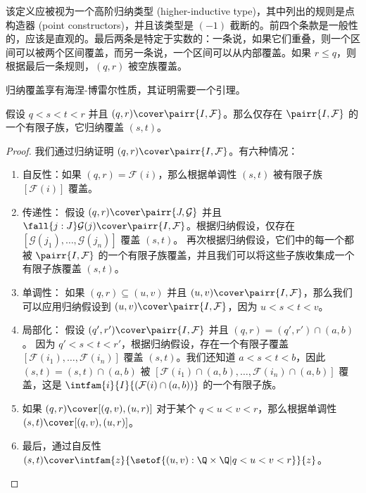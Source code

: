 该定义应被视为一个高阶归纳类型 (higher-inductive type)，其中列出的规则是点构造器 (point constructors)，并且该类型是 $(-1)$ 截断的。前四个条款是一般性的，应该是直观的。最后两条是特定于实数的：一条说，如果它们重叠，则一个区间可以被两个区间覆盖，而另一条说，一个区间可以从内部覆盖。如果 $r \leq q$，则根据最后一条规则，$(q, r)$ 被空族覆盖。

归纳覆盖享有海涅-博雷尔性质，其证明需要一个引理。

\begin{lem} \label{reals-formal-topology-locally-compact}
假设 $q < s < t < r$ 并且 $(q, r) \cover \pairr{I, \mathcal{F}}$。那么仅存在 $\pairr{I, \mathcal{F}}$ 的一个有限子族，它归纳覆盖 $(s, t)$。
\end{lem}

\begin{proof}
  我们通过归纳证明 $(q, r) \cover \pairr{I, \mathcal{F}}$。有六种情况：
  \begin{enumerate}

    \item 自反性：如果 $(q, r) = \mathcal{F}(i)$，那么根据单调性 $(s, t)$ 被有限子族 $[\mathcal{F}(i)]$ 覆盖。

    \item 传递性：
    假设 $(q, r) \cover \pairr{J, \mathcal{G}}$ 并且 $\fall{j : J} \mathcal{G}(j) \cover \pairr{I, \mathcal{F}}$。根据归纳假设，仅存在 $[\mathcal{G}(j_1), \ldots, \mathcal{G}(j_n)]$ 覆盖 $(s, t)$。
    再次根据归纳假设，它们中的每一个都被 $\pairr{I, \mathcal{F}}$ 的一个有限子族覆盖，并且我们可以将这些子族收集成一个有限子族覆盖 $(s, t)$。

    \item 单调性：
    如果 $(q, r) \subseteq (u, v)$ 并且 $(u, v) \cover \pairr{I, \mathcal{F}}$，那么我们可以应用归纳假设到 $(u, v) \cover \pairr{I, \mathcal{F}}$，因为 $u < s < t < v$。

    \item 局部化：
    假设 $(q', r') \cover \pairr{I, \mathcal{F}}$ 并且 $(q, r) = (q', r') \cap (a, b)$。
    因为 $q' < s < t < r'$，根据归纳假设，存在一个有限子覆盖 $[\mathcal{F}(i_1), \ldots, \mathcal{F}(i_n)]$ 覆盖 $(s, t)$。我们还知道 $a < s < t < b$，因此 $(s, t) = (s, t) \cap (a, b)$ 被 $[\mathcal{F}(i_1) \cap (a,b), \ldots, \mathcal{F}(i_n) \cap (a,b)]$ 覆盖，这是 $\intfam{i}{I}{(\mathcal{F}(i) \cap (a, b))}$ 的一个有限子族。

    \item 如果 $(q, r) \cover [(q, v), (u, r)]$ 对于某个 $q < u < v < r$，那么根据单调性 $(s, t) \cover [(q, v), (u, r)]$。

    \item 最后，通过自反性 $(s, t) \cover \intfam{z}{\setof{ (u,v):\Q \times \Q | q < u < v < r}}{z}$。 \qedhere
  \end{enumerate}
\end{proof}

